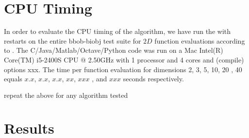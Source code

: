 \documentclass[sigconf]{acmart}
\newcommand{\change}[1]{{\color{red} #1}}
\begin{document}




\maketitle


%
%
%

\section{CPU Timing}
In order to evaluate the CPU timing of the algorithm, we have run the \change{\algorithmA} with restarts on the entire bbob-biobj test suite \cite{biobj2016func} for $2 D$ function evaluations according to \cite{hansen2016exp}. The \change{C/Java/Matlab/Octave/Python} code was run on a \change{Mac Intel(R) Core(TM) i5-2400S CPU @ 2.50GHz} with \change{1} processor and \change{4} cores \change{and (compile) options xxx}. The time per function evaluation for dimensions 2, 3, 5, 10, 20\change{, 40} equals \change{$x.x$}, \change{$x.x$}, \change{$x.x$}, \change{$xx$}, \change{$xxx$}\change{, and $xxx$} seconds respectively. 

\change{repeat the above for any algorithm tested}

\section{Results}
\end{document}
